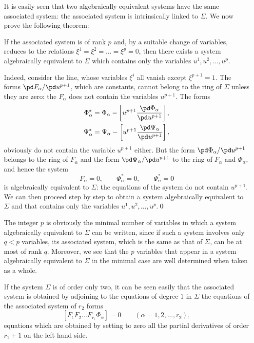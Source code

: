 \vspace{12pt}\fsec It is easily seen that two algebraically equivalent systems have the same associated system: the associated system is intrinsically linked to $\Sigma$. We now prove the following theorem:
\begin{thm*}
  If the associated system is of rank $p$ and, by a suitable change of variables, reduces to the relations $\xi^{1}=\xi^{2}=\dots=\xi^{p}=0$, then there exists a system algebraically equivalent to $\Sigma$ which contains only the variables $u^{1},u^{2},\dots,u^{p}$.
\end{thm*}

Indeed, consider the line, whose variables $\xi^{i}$ all vanish except $\xi^{p+1}=1$. The forms $\pd F_{\alpha}/\pd u^{p+1}$, which are constants, cannot belong to the ring of $\Sigma$ unless they are zero: the $F_{\alpha}$ does not contain the variables $u^{p+1}$. The forms
\begin{align*}
  \Phi^{*}_{\alpha}&=\Phi_{\alpha}-\left[u^{p+1}\frac{\pd\Phi_{\alpha}}{\pd u^{p+1}}\right],\\
  \Psi^{*}_{\alpha}&=\Psi_{\alpha}-\left[u^{p+1}\frac{\pd\Psi_{\alpha}}{\pd u^{p+1}}\right],
\end{align*}
obviously do not contain the variable $u^{p+1}$ either. But the form $\pd\Phi_{\alpha}/\pd u^{p+1}$ belongs to the ring of $F_{\alpha}$ and the form $\pd\Psi_{\alpha}/\pd u^{p+1}$ to the ring of $F_{\alpha}$ and $\Phi_{\alpha}$, and hence the system
\[
F_{\alpha}=0,\qquad \Phi^{*}_{\alpha}=0,\qquad \Psi^{*}_{\alpha}=0
\]
is algebraically equivalent to $\Sigma$: the equations of the system do not contain $u^{p+1}$. We can then proceed step by step to obtain a system algebraically equivalent to $\Sigma$ and that contains only the variables $u^{1},u^{2},\dots,u^{p}$.\qed

\begin{rmk*}
  The integer $p$ is obviously the minimal number of variables in which a system algebraically equivalent to $\Sigma$ can be written, since if such a system involves only $q<p$ variables, its associated system, which is the same as that of $\Sigma$, can be at most of rank $q$. Moreover, we see that the $p$ variables that appear in a system algebraically equivalent to $\Sigma$ in the minimal case are  well determined when taken as a whole.
\end{rmk*}

\begin{pcase*}
  If the system $\Sigma$ is of order only two, it can be seen easily that the associated system is obtained by adjoining to the equations of degree $1$ in $\Sigma$ the equations of the associated system of $r_{2}$ forms
\[
[F_{1}F_{2}\dots F_{r_{1}}\Phi_{\alpha}]=0\qquad(\alpha=1,2,\dots,r_{2}),
\]
equations which are obtained by setting to zero all the partial derivatives of order $r_{1}+1$ on the left hand side.
\end{pcase*}


